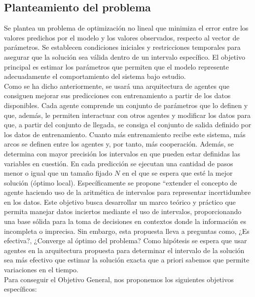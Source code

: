 \documentclass{article}
\begin{document}
\subsection*{Planteamiento del problema}

Se plantea un problema de optimización no lineal que minimiza el error entre los valores predichos por el modelo y los valores observados, respecto al vector de parámetros. Se establecen condiciones iniciales y restricciones temporales para asegurar que la solución sea válida dentro de un intervalo específico. El objetivo principal es estimar los parámetros que permiten que el modelo represente adecuadamente el comportamiento del sistema bajo estudio. \\

Como se ha dicho anteriormente, se usará una arquitectura de agentes que consiguen mejorar sus predicciones con entrenamiento a partir de los datos disponibles. Cada agente comprende un conjunto de parámetros que lo definen y que, además, le permiten interactuar con otros agentes y modificar los datos para que, a partir del conjunto de llegada, se consiga el conjunto de salida definido por los datos de entrenamiento. Cuanto más entrenamiento recibe este sistema, más arcos se definen entre los agentes y, por tanto, más cooperación. Además, se determina con mayor precisión los intervalos en que pueden estar definidas las variables en cuestión. En cada predicción se ejecutan una cantidad de pasos menor o igual que un tamaño fijado $N$ en el que se espera que esté la mejor solución (óptimo local). Específicamente se propone ``extender el concepto de agente haciendo uso de la aritmética de intervalos para representar incertidumbre en los datos. Este objetivo busca desarrollar un marco teórico y práctico que permita manejar datos inciertos mediante el uso de intervalos, proporcionando una base sólida para la toma de decisiones en contextos donde la información es incompleta o imprecisa. Sin embargo, esta propuesta lleva a preguntas como, ¿Es efectiva?, ¿Converge al óptimo del problema? Como hipótesis se espera que usar agentes en la arquitectura propuesta para determinar el intervalo de la solución sea más efectivo que estimar la solución exacta que a priori sabemos que permite variaciones en el tiempo. \\

Para conseguir el Objetivo General, nos proponemos los siguientes objetivos específicos:
\end{document}
